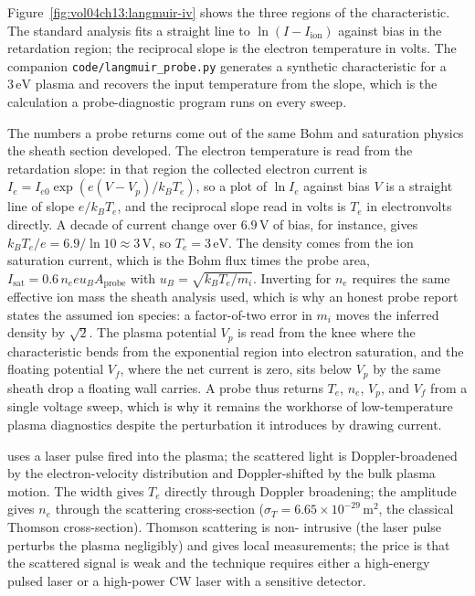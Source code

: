 

Figure~\ref{fig:vol04ch13:langmuir-iv} shows the three regions of the
characteristic. The standard analysis fits a straight line to
$\ln(I - I_{\mathrm{ion}})$ against bias in the retardation region; the
reciprocal slope is the electron temperature in volts.
The companion \texttt{code/langmuir\_probe.py} generates a synthetic
characteristic for a $3\,\si{\electronvolt}$ plasma and recovers the input
temperature from the slope, which is the calculation a probe-diagnostic
program runs on every sweep.

The numbers a probe returns come out of the same Bohm and saturation
physics the sheath section developed. The electron temperature is read from
the retardation slope: in that region the collected electron current is
$I_e = I_{e0}\exp(e(V - V_p)/k_B T_e)$, so a plot of $\ln I_e$ against bias
$V$ is a straight line of slope $e/k_B T_e$, and the reciprocal slope read
in volts is $T_e$ in electronvolts directly. A decade of current change over
$6.9\,\si{\volt}$ of bias, for instance, gives $k_B T_e/e = 6.9/\ln 10
\approx 3\,\si{\volt}$, so $T_e = 3\,\si{\electronvolt}$. The density comes
from the ion saturation current, which is the Bohm flux times the probe
area, $I_{\mathrm{sat}} = 0.6\,n_e e u_B A_{\mathrm{probe}}$ with $u_B =
\sqrt{k_B T_e/m_i}$. Inverting for $n_e$ requires the same effective ion
mass the sheath analysis used, which is why an honest probe report states
the assumed ion species: a factor-of-two error in $m_i$ moves the inferred
density by $\sqrt{2}$. The plasma potential $V_p$ is read from the knee
where the characteristic bends from the exponential region into electron
saturation, and the floating potential $V_f$, where the net current is
zero, sits below $V_p$ by the same sheath drop a floating wall carries. A
probe thus returns $T_e$, $n_e$, $V_p$, and $V_f$ from a single voltage
sweep, which is why it remains the workhorse of low-temperature plasma
diagnostics despite the perturbation it introduces by drawing current.

 uses a laser pulse fired into the plasma;
the scattered light is Doppler-broadened by the electron-velocity
distribution and Doppler-shifted by the bulk plasma motion. The
width gives $T_{e}$ directly through Doppler broadening; the
amplitude gives $n_{e}$ through the scattering cross-section
($\sigma_{T} = 6.65\times 10^{-29}\,\si{\meter\squared}$, the
classical Thomson cross-section). Thomson scattering is non-
intrusive (the laser pulse perturbs the plasma negligibly) and gives
local measurements; the price is that the scattered signal is weak
and the technique requires either a high-energy pulsed laser or a
high-power CW laser with a sensitive detector.

